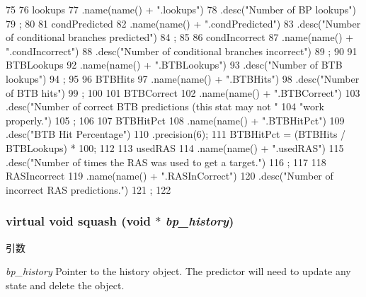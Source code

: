 \begin{DoxyCode}
75 {
76     lookups
77         .name(name() + ".lookups")
78         .desc("Number of BP lookups")
79         ;
80 
81     condPredicted
82         .name(name() + ".condPredicted")
83         .desc("Number of conditional branches predicted")
84         ;
85 
86     condIncorrect
87         .name(name() + ".condIncorrect")
88         .desc("Number of conditional branches incorrect")
89         ;
90 
91     BTBLookups
92         .name(name() + ".BTBLookups")
93         .desc("Number of BTB lookups")
94         ;
95 
96     BTBHits
97         .name(name() + ".BTBHits")
98         .desc("Number of BTB hits")
99         ;
100 
101     BTBCorrect
102         .name(name() + ".BTBCorrect")
103         .desc("Number of correct BTB predictions (this stat may not "
104               "work properly.")
105         ;
106 
107     BTBHitPct
108         .name(name() + ".BTBHitPct")
109         .desc("BTB Hit Percentage")
110         .precision(6);
111     BTBHitPct = (BTBHits / BTBLookups) * 100;
112 
113     usedRAS
114         .name(name() + ".usedRAS")
115         .desc("Number of times the RAS was used to get a target.")
116         ;
117 
118     RASIncorrect
119         .name(name() + ".RASInCorrect")
120         .desc("Number of incorrect RAS predictions.")
121         ;
122 }
\end{DoxyCode}
\hypertarget{classBPredUnit_a2af63ba741727bdf58e2b2dc22a912ed}{
\subsubsection[{squash}]{\setlength{\rightskip}{0pt plus 5cm}virtual void squash (void $\ast$ {\em bp\_\-history})}}
\label{classBPredUnit_a2af63ba741727bdf58e2b2dc22a912ed}

\begin{DoxyParams}{引数}
\item[{\em bp\_\-history}]Pointer to the history object. The predictor will need to update any state and delete the object. \end{DoxyParams}


